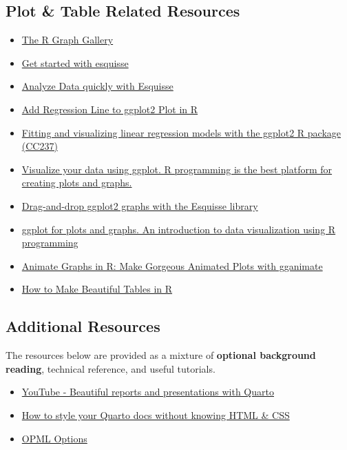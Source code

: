 \documentclass[
  letterpaper,
  DIV=11,
  numbers=noendperiod]{scrartcl}
\providecommand{\tightlist}{%
  \setlength{\itemsep}{0pt}\setlength{\parskip}{0pt}}\usepackage{longtable,booktabs,array}
\begin{document}
\subsection{Plot \& Table Related
Resources}\label{plot-table-related-resources}

\begin{itemize}
\tightlist
\item
  \href{https://r-graph-gallery.com/}{The R Graph Gallery}
\item
  \href{https://cran.r-project.org/web/packages/esquisse/vignettes/get-started.html}{Get
  started with esquisse}
\item
  \href{https://towardsdatascience.com/how-to-analyze-data-quickly-without-tableau-but-close-66eb1f2fffd2}{Analyze
  Data quickly with Esquisse}
\item
  \href{https://www.geeksforgeeks.org/add-regression-line-to-ggplot2-plot-in-r/}{Add
  Regression Line to ggplot2 Plot in R}
\item
  \href{https://youtu.be/1Vs-ckEI94M}{Fitting and visualizing linear
  regression models with the ggplot2 R package (CC237)}
\item
  \href{https://youtu.be/rfR9Nrpfnyg}{Visualize your data using ggplot.
  R programming is the best platform for creating plots and graphs.}
\item
  \href{https://youtu.be/FWLxE-ARuO8}{Drag-and-drop ggplot2 graphs with
  the Esquisse library}
\item
  \href{https://youtu.be/HPJn1CMvtmI\%5D}{ggplot for plots and graphs.
  An introduction to data visualization using R programming}
\item
  \href{https://www.youtube.com/watch?v=SnCi0s0e4Io}{Animate Graphs in
  R: Make Gorgeous Animated Plots with gganimate}
\item
  \href{https://rfortherestofus.com/2019/11/how-to-make-beautiful-tables-in-r\#:~:text=kable\%20\%2B\%20kableExtra&text=The\%20goal\%20of\%20kableExtra\%20is,similar\%20with\%20ggplot2\%20and\%20plotly\%20.}{How
  to Make Beautiful Tables in R}
\end{itemize}

\subsection{Additional Resources}\label{additional-resources}

The resources below are provided as a mixture of \textbf{optional
background reading}, technical reference, and useful tutorials.

\begin{itemize}
\tightlist
\item
  \href{https://youtu.be/hbf7Ai3jnxY?t=1693}{YouTube - Beautiful reports
  and presentations with Quarto}
\item
  \href{https://youtu.be/jX4_Dnzhl0M}{How to style your Quarto docs
  without knowing HTML \& CSS}
\item
  \href{https://quarto.org/docs/reference/formats/opml.html}{OPML
  Options}
\end{itemize}
\end{document}
